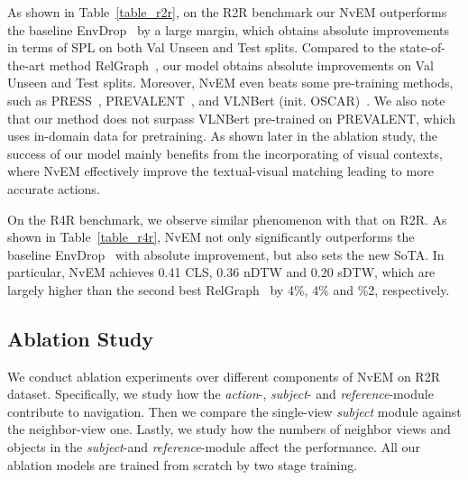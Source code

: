 \documentclass[sigconf]{acmart}
\begin{document}
As shown in Table~\ref{table_r2r}, on the R2R benchmark  our NvEM outperforms the baseline EnvDrop~\cite{tan2019envdrop} by a large margin, which obtains  absolute improvements in terms of SPL on both Val Unseen and Test splits.
Compared to the state-of-the-art method RelGraph~\cite{hong2020relgraph}, our model obtains  absolute improvements on Val Unseen and Test splits. 
Moreover, NvEM even beats some pre-training methods, such as PRESS~\cite{li2019press}, PREVALENT~\cite{hao2020prevelant}, and VLNBert (init. OSCAR)~\cite{hong2020vln-bert}. 
We also note that our method does not surpass VLNBert pre-trained on PREVALENT, which uses in-domain data for pretraining.
As shown later in the ablation study, the success of our model mainly benefits from  the  incorporating of visual contexts, where NvEM effectively improve the textual-visual matching leading to more accurate actions. 


On the R4R benchmark, we observe similar phenomenon with that on R2R. As shown in Table~\ref{table_r4r}, NvEM not only significantly outperforms the baseline EnvDrop~\cite{tan2019envdrop} with  absolute improvement, but also sets the new SoTA. 
In particular, NvEM achieves 0.41 CLS, 0.36 nDTW and 0.20 sDTW, which are largely higher than the second best RelGraph~\cite{hong2020relgraph} by 4\%, 4\% and \%2, respectively. 


\subsection{Ablation Study}\label{sec_ablation}
We conduct  ablation experiments over different components of NvEM on R2R dataset. Specifically, we study how the \textit{action}-, \textit{subject}- and \textit{reference}-module contribute to navigation. Then we compare the single-view \textit{subject} module against the neighbor-view one. Lastly, we study how the numbers of neighbor views and objects in the \textit{subject}-and \textit{reference}-module affect the performance. All our ablation models are trained from scratch by two stage training.
\end{document}
